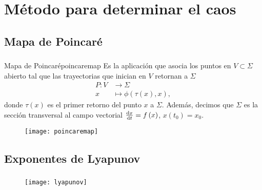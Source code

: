 \section{Método para determinar el caos}

\subsection{Mapa de Poincaré}

\begin{frame}
	\frametitle{\subsecname}

	\begin{minipage}{0.6\textwidth}
		\begin{definition}{Mapa de Poincaré}{poincaremap}
			Es la aplicación que asocia los puntos en $V\subset\Sigma$ abierto
			tal que las trayectorias que inician en $V$ retornan a $\Sigma$
			\begin{align*}
				P\colon V & \to\Sigma                                      \\
				x         & \mapsto\phi\left(\tau\left(x\right), x\right),
			\end{align*}
			donde $\tau\left(x\right)$ es el primer retorno del punto $x$ a $\Sigma$.
			Además, decimos que $\Sigma$ es la sección transversal al campo vectorial
			$\diff{x}{t}=f\left(x\right)$, $x\left(t_{0}\right)=x_{0}$.
		\end{definition}
	\end{minipage}
	\begin{minipage}{0.3\textwidth}
		\begin{figure}[ht!]
			\centering
			\texttt{[image: poincaremap]}
		\end{figure}
	\end{minipage}

\end{frame}


\subsection{Exponentes de Lyapunov}

\begin{frame}
	\frametitle{\subsecname}

	\begin{figure}[ht!]
		\centering
		\texttt{[image: lyapunov]}
	\end{figure}
\end{frame}

